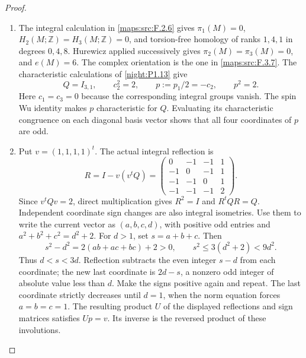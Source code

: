 \documentclass[11pt,a4paper]{article}
\theoremstyle{definition}
\begin{document}
\begin{proof}
\begin{enumerate}[label=\arabic*.]
\item The integral calculation in \cref{maps:src:F.2.6} gives
$\pi_1(M)=0$, $H_2(M;\mathbb Z)=H_3(M;\mathbb Z)=0$, and
torsion-free homology of ranks $1,4,1$ in degrees $0,4,8$.
Hurewicz applied successively gives $\pi_2(M)=\pi_3(M)=0$, and
$e(M)=6$. The complex orientation is the one in
\cref{maps:src:F.3.7}. The characteristic calculations of \cref{night:P1.13} give
\[
Q=I_{3,1},\qquad c_2^2=2,\qquad
p:=p_1/2=-c_2,\qquad p^2=2.
\]
Here $c_1=c_3=0$ because the corresponding integral groups vanish.
The spin Wu identity makes $p$ characteristic for $Q$. Evaluating
its characteristic congruence on each diagonal basis vector shows
that all four coordinates of $p$ are odd.

\item Put $v=(1,1,1,1)^t$. The actual integral reflection is
\[
R=I-v(v^tQ)=
\begin{pmatrix}
0&-1&-1&1\\
-1&0&-1&1\\
-1&-1&0&1\\
-1&-1&-1&2
\end{pmatrix}.
\]
Since $v^tQv=2$, direct multiplication gives $R^2=I$ and
$R^tQR=Q$. Independent coordinate sign changes are also integral
isometries. Use them to write the current vector as $(a,b,c,d)$,
with positive odd entries and
$a^2+b^2+c^2=d^2+2$. For $d>1$, set $s=a+b+c$. Then
\[
s^2-d^2=2(ab+ac+bc)+2>0,\qquad
s^2\leq3(d^2+2)<9d^2.
\]
Thus $d<s<3d$. Reflection subtracts the even integer $s-d$ from
each coordinate; the new last coordinate is $2d-s$, a nonzero odd
integer of absolute value less than $d$. Make the signs positive
again and repeat. The last coordinate strictly decreases until
$d=1$, when the norm equation forces $a=b=c=1$. The resulting
product $U$ of the displayed reflections and sign matrices satisfies
$Up=v$. Its inverse is the reversed product of these involutions.


\end{enumerate}
\end{proof}
\end{document}
